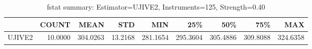 \begin{table}[ht]
\centering
\caption{fstat summary: Estimator=UJIVE2, Instruments=125, Strength=0.40}
\begin{tabular}{lrrrrrrrr}
\toprule
 & COUNT & MEAN & STD & MIN & 25\% & 50\% & 75\% & MAX \\
\midrule
UJIVE2 & 10.0000 & 304.0263 & 13.2168 & 281.1654 & 295.3604 & 305.4886 & 309.8088 & 324.6358 \\
\bottomrule
\end{tabular}
\end{table}
